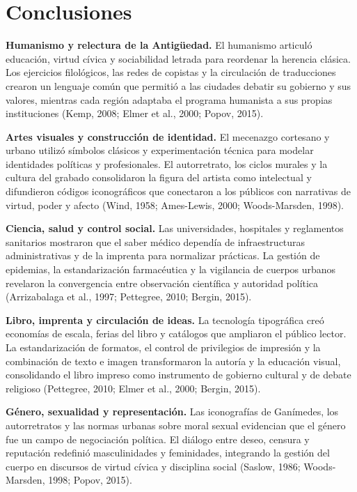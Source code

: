 \chapter*{Conclusiones}
\textbf{Humanismo y relectura de la Antigüedad.} El humanismo articuló educación, virtud cívica y sociabilidad letrada para reordenar la herencia clásica. Los ejercicios filológicos, las redes de copistas y la circulación de traducciones crearon un lenguaje común que permitió a las ciudades debatir su gobierno y sus valores, mientras cada región adaptaba el programa humanista a sus propias instituciones (Kemp, 2008; Elmer et al., 2000; Popov, 2015).

\textbf{Artes visuales y construcción de identidad.} El mecenazgo cortesano y urbano utilizó símbolos clásicos y experimentación técnica para modelar identidades políticas y profesionales. El autorretrato, los ciclos murales y la cultura del grabado consolidaron la figura del artista como intelectual y difundieron códigos iconográficos que conectaron a los públicos con narrativas de virtud, poder y afecto (Wind, 1958; Ames-Lewis, 2000; Woods-Marsden, 1998).

\textbf{Ciencia, salud y control social.} Las universidades, hospitales y reglamentos sanitarios mostraron que el saber médico dependía de infraestructuras administrativas y de la imprenta para normalizar prácticas. La gestión de epidemias, la estandarización farmacéutica y la vigilancia de cuerpos urbanos revelaron la convergencia entre observación científica y autoridad política (Arrizabalaga et al., 1997; Pettegree, 2010; Bergin, 2015).

\textbf{Libro, imprenta y circulación de ideas.} La tecnología tipográfica creó economías de escala, ferias del libro y catálogos que ampliaron el público lector. La estandarización de formatos, el control de privilegios de impresión y la combinación de texto e imagen transformaron la autoría y la educación visual, consolidando el libro impreso como instrumento de gobierno cultural y de debate religioso (Pettegree, 2010; Elmer et al., 2000; Bergin, 2015).

\textbf{Género, sexualidad y representación.} Las iconografías de Ganímedes, los autorretratos y las normas urbanas sobre moral sexual evidencian que el género fue un campo de negociación política. El diálogo entre deseo, censura y reputación redefinió masculinidades y feminidades, integrando la gestión del cuerpo en discursos de virtud cívica y disciplina social (Saslow, 1986; Woods-Marsden, 1998; Popov, 2015).
